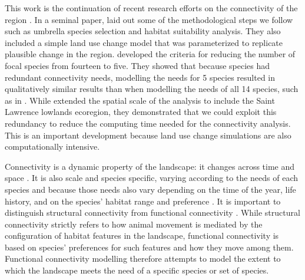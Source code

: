 This work is the continuation of recent research efforts on the connectivity of the region \citep{albert_applying_2017, rayfield_priorisation_2018}. In a seminal paper, \cite{albert_applying_2017} laid out some of the methodological steps we follow such as umbrella species selection and habitat suitability analysis. They also included a simple land use change model that was parameterized to replicate plausible change in the region. \cite{meurant_selecting_2018} developed the criteria for reducing the number of focal species from fourteen to five. They showed that because species had redundant connectivity needs, modelling the needs for 5 species resulted in qualitatively similar results than when modelling the needs of all 14 species, such as in \cite{albert_applying_2017}. While \cite{rayfield_priorisation_2018} extended the spatial scale of the analysis to include the Saint Lawrence lowlands ecoregion, they demonstrated that we could exploit this redundancy to reduce the computing time needed for the connectivity analysis. This is an important development because land use change simulations are also computationally intensive.

Connectivity is a dynamic property of the landscape: it changes across time and space \citep{beyer_functional_2013}. It is also scale and species specific, varying according to the needs of each species and because those needs also vary depending on the time of the year, life history, and on the species’ habitat range and preference \citep{anderson_scale-dependent_2005}. It is important to distinguish structural connectivity from functional connectivity \citep{kindlmann_connectivity_2008}. While structural connectivity strictly refers to how animal movement is mediated by the configuration of habitat features in the landscape, functional connectivity is based on species’ preferences for such features and how they move among them. Functional connectivity modelling therefore attempts to model the extent to which the landscape meets the need of a specific species or set of species.

